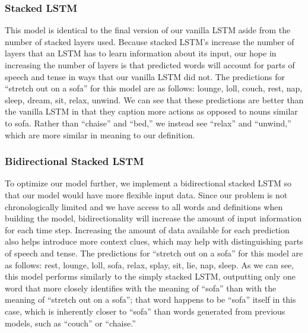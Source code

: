 \documentclass{article} %
\begin{document}
\subsubsection{Stacked LSTM}

This model is identical to the final version of our vanilla LSTM aside from the number of stacked layers used. Because stacked LSTM’s increase the number of layers that an LSTM has to learn information about its input, our hope in increasing the number of layers is that predicted words will account for parts of speech and tense in ways that our vanilla LSTM did not.
The predictions for “stretch out on a sofa” for this model are as follows: lounge, loll, couch, rest, nap, sleep, dream, sit, relax, unwind.
We can see that these predictions are better than the vanilla LSTM in that they caption more actions as opposed to nouns similar to sofa. Rather than “chaise” and “bed,” we instead see “relax” and “unwind,” which are more similar in meaning to our definition. 

\subsubsection{Bidirectional Stacked LSTM}
To optimize our model further, we implement a bidirectional stacked LSTM so that our model would have more flexible input data. Since our problem is not chronologically limited and we have access to all words and definitions when building the model, bidirectionality will increase the amount of input information for each time step. Increasing the amount of data available for each prediction also helps introduce more context clues, which may help with distinguishing parts of speech and tense.  
The predictions for “stretch out on a sofa” for this model are as follows: rest, lounge, loll, sofa, relax, splay, sit, lie, nap, sleep.
As we can see, this model performs similarly to the simply stacked LSTM, outputting only one word that more closely identifies with the meaning of “sofa” than with the meaning of “stretch out on a sofa”; that word happens to be “sofa” itself in this case, which is inherently closer to “sofa” than words generated from previous models, such as “couch” or “chaise.”
\end{document}
